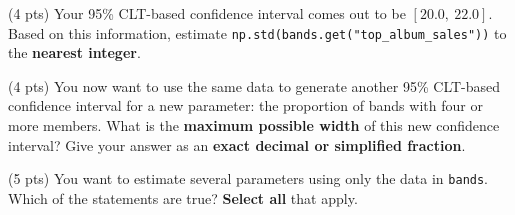 \documentclass[twoside,12pt]{article}
\begin{document}
\begin{probset}
\begin{prob}[(17 pts)]
\begin{subprobset}
\begin{subprob}
\smallskip
{}

\smallskip
{}

\smallskip
{}

\smallskip
{}

\smallskip
{}



\end{subprob}

\bigskip

\begin{subprob}(4 pts) Your 95\% CLT-based confidence interval comes out to be $[20.0,\ 22.0]$. Based on this information, estimate \texttt{np.std(bands.get("top\_album\_sales"))} to the \textbf{nearest integer}.

\begin{center}
\end{center}

\end{subprob}

\bigskip

\begin{subprob}(4 pts) You now want to use the same data to generate another 95\% CLT-based confidence interval for a new parameter: the proportion of bands with four or more members. What is the \textbf{maximum possible width} of this new confidence interval? Give your answer as an \textbf{exact decimal or simplified fraction}.

\begin{center}
\end{center}

\end{subprob}

\newpage

\begin{subprob}(5 pts) You want to estimate several parameters using only the data in \texttt{bands}. Which of the statements are true? \textbf{Select all} that apply.

\smallskip
{}


\end{subprob}
\end{subprobset}
\end{prob}
\end{probset}
\end{document}
